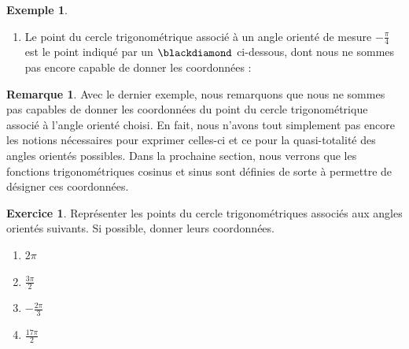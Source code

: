 \documentclass[a4paper,fontsize=13pt]{scrreprt}
\theoremstyle{plain}
\theoremstyle{definition}
\newtheorem{exe}[subsection]{Exemple}
\newtheorem{rema}[subsection]{Remarque}
\newtheorem{exo}[subsection]{Exercice}
\newcommand {\axes} {
	\draw[thick, ->] (\xmin,0) -- (\xmax+1,0);
	\draw[thick, ->] (0,\ymin) -- (0,\ymax+1);
	\draw (0,\ymax+0.5) node [left] {$y$};
	\draw (\xmax+0.5, 0) node [below] {$x$};
	\draw[thick] (-0.15,1)--(0.15,1) (1,-0.15)--(1,0.15);
	\draw (0,1)node[left]{$1$} (1,0)node[below]{$1$};
}
\begin{document}
\begin{exe}
\begin{enumerate}
\begin{center}
\end{center}
\item Le point du cercle trigonométrique associé à un angle orienté de mesure $-\frac{\pi}{4}$ est le point indiqué par un $\blackdiamond$ ci-dessous, dont nous ne sommes pas encore capable de donner les coordonnées :
\begin{center}
\end{center}
\end{enumerate}
\end{exe}

\begin{rema}
Avec le dernier exemple, nous remarquons que nous ne sommes pas capables de donner les coordonnées du point du cercle trigonométrique associé à l'angle orienté choisi. En fait, nous n'avons tout simplement pas encore les notions nécessaires pour exprimer celles-ci et ce pour la quasi-totalité des angles orientés possibles. Dans la prochaine section, nous verrons que les fonctions trigonométriques cosinus et sinus sont définies de sorte à permettre de désigner ces coordonnées.
\end{rema}

\begin{exo}
Représenter les points du cercle trigonométriques associés aux angles orientés suivants. Si possible, donner leurs coordonnées.
\begin{enumerate}
\item $2\pi$
\item $\frac{3\pi}{2}$
\item $-\frac{2\pi}{3}$
\item $\frac{17\pi}{2}$
\end{enumerate}
\end{exo}
\end{document}
